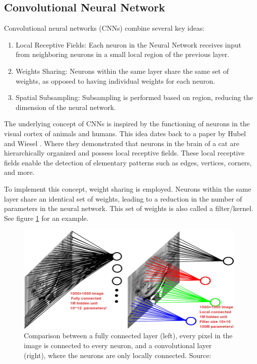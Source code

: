 \subsection{Convolutional Neural Network}

Convolutional neural networks (CNNs) combine several key ideas:
\begin{enumerate}
    \item  Local Receptive Fields: Each neuron in the Neural Network receives input from neighboring neurons in a small local region of the previous layer.
    \item Weights Sharing: Neurons within the same layer share the same set of weights, as opposed to having individual weights for each neuron.
    \item Spatial Subsampling: Subsampling is performed based on region, reducing the dimension of the neural network.
\end{enumerate}

The underlying concept of CNNs is inspired by the functioning of neurons in the visual cortex of animals and humans.
This idea dates back to a paper by Hubel and Wiesel \citep{hubel1962receptive}.
Where they demonstrated that neurons in the brain of a cat are hierarchically organized and possess local receptive fields. These local receptive fields enable the detection of elementary patterns such as edges, vertices, corners, and more.

To implement this concept, weight sharing is employed.
Neurons within the same layer share an identical set of weights, leading to a reduction in the number of parameters in the neural network.
This set of weights is also called a filter/kernel.
See figure \ref{fi:weight-sharing} for an example.

\begin{figure}[!h]
    \centering
    \includegraphics[width=1\textwidth]{figures/weight_Sharing_cnn.png}
    \caption{
    Comparison between a fully connected layer (left), every pixel in the image is connected to every neuron, and a convolutional layer (right), where the neurons are only locally connected.
    Source: \citep{phdthesis}
    }
    \label{fi:weight-sharing}
\end{figure}

